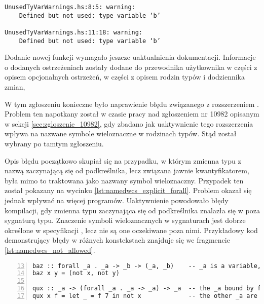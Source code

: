 \begin{lstlisting}[language={},label={lst:unused_test_stderr},
                   caption={Ostrzeżenia generowany przez kompilator dla fragmentu \ref{lst:unused_test_code} po wprowadzeniu zmian.}]
UnusedTyVarWarnings.hs:8:5: warning:
    Defined but not used: type variable ‘b’

UnusedTyVarWarnings.hs:11:18: warning:
    Defined but not used: type variable ‘b’
\end{lstlisting}

Dodanie nowej funkcji wymagało jeszcze uaktualnienia dokumentacji. Informacje o dodanych ostrzeżeniach zostały dodane do przewodnika użytkownika w części z opisem opcjonalnych ostrzeżeń, w części z opisem rodzin typów i dodziennika zmian,


\label{sec:zgloszenie_11098}

W tym zgłoszeniu konieczne było naprawienie błędu związanego z rozszerzeniem . Problem ten napotkany został w czasie pracy nad zgłoszeniem nr 10982 opisanym w sekcji \ref{sec:zgloszenie_10982}, gdy zbadano jak uaktywnienie tego rozszerzenia wpływa na nazwane symbole wieloznaczne w rodzinach typów. Stąd został wybrany po tamtym zgłoszeniu.

Opis błędu początkowo skupiał się na przypadku, w którym zmienna typu z nazwą zaczynającą się od podkreślnika, lecz związana jawnie kwantyfikatorem, była mimo to traktowana jako nazwany symbol wieloznaczny. Przypadek ten został pokazany na wycinku \ref{lst:namedwcs_explicit_forall}. Problem okazał się jednak wpływać na więcej programów. Uaktywnienie  powodowało błędy kompilacji, gdy zmienna typu zaczynająca się od podkreślnika znalazła się w poza sygnaturą typu. Znaczenie symboli wieloznacznych w sygnaturach jest dobrze określone w specyfikacji , lecz nie są one oczekiwane poza nimi. Przykładowy kod demonstrujący błędy w różnych konstekstach znajduje się we fragmencie \ref{lst:namedwcs_not_allowed}.

\begin{lstlisting}[numbers=left,firstnumber=13,label={lst:namedwcs_explicit_forall},
                   caption={Fragment testu \code{NamedWildcardExplicitForall} sprawdzającego, czy zmienne związane kwantyfikatorem nie zostają zamienione w wieloznaczniki.}]
baz :: forall _a . _a -> _b -> (_a, _b)    -- _a is a variable, _b is a wildcard
baz x y = (not x, not y)

qux :: _a -> (forall _a . _a -> _a) -> _a  -- the _a bound by forall is a tyvar
qux x f = let _ = f 7 in not x             -- the other _a are wildcards
\end{lstlisting}


